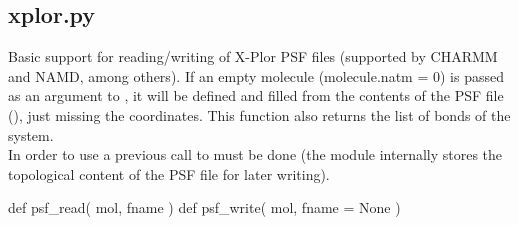 \normalsize
\subsection[xplor]{xplor.py}
Basic support for reading/writing of X-Plor PSF files (supported by CHARMM and NAMD, among others).
If an empty molecule (molecule.natm = 0) is passed as an argument to , it will be defined and filled from the contents of the PSF file (), just missing the coordinates. This function also returns the list of bonds of the system.\\
In order to use  a previous call to  must be done (the module internally stores the topological content of the PSF file for later writing).
\begin{pyglist}[language=python,fvset={frame=single}]
def psf_read( mol, fname )
def psf_write( mol, fname = None )
\end{pyglist}
